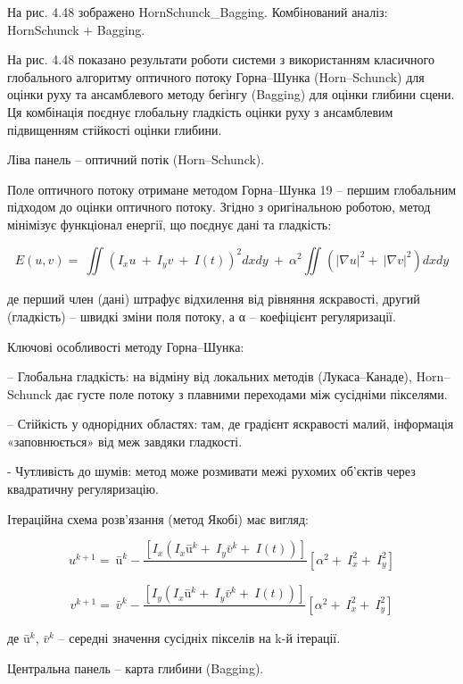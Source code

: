 \documentclass[
]{article}
\begin{document}
На рис. 4.48 зображено HornSchunck\_Bagging. Комбінований аналіз: HornSchunck + Bagging.

На рис. 4.48 показано результати роботи системи з використанням класичного глобального алгоритму оптичного потоку Горна--Шунка (Horn--Schunck) для оцінки руху та ансамблевого методу бегінгу (Bagging) для оцінки глибини сцени. Ця комбінація поєднує глобальну гладкість оцінки руху з ансамблевим підвищенням стійкості оцінки глибини.

Ліва панель -- оптичний потік (Horn--Schunck).

Поле оптичного потоку отримане методом Горна--Шунка 19 -- першим глобальним підходом до оцінки оптичного потоку. Згідно з оригінальною роботою, метод мінімізує функціонал енергії, що поєднує дані та гладкість:

\[E(u,v) = \ \iint_{}^{}{\left( I_{x}u\  + \ I_{y}v\  + \ I(t) \right)^{2}dx}dy\  + \ \alpha^{2}\iint_{}^{}{\left( |\nabla u|^{2} + \ |\nabla v|^{2} \right)dx}dy\]

де перший член (дані) штрафує відхилення від рівняння яскравості, другий (гладкість) -- швидкі зміни поля потоку, а α -- коефіцієнт регуляризації.

Ключові особливості методу Горна--Шунка:

-- Глобальна гладкість: на відміну від локальних методів (Лукаса--Канаде), Horn--Schunck дає густе поле потоку з плавними переходами між сусідніми пікселями.

-- Стійкість у однорідних областях: там, де градієнт яскравості малий, інформація «заповнюється» від меж завдяки гладкості.

- Чутливість до шумів: метод може розмивати межі рухомих об'єктів через квадратичну регуляризацію.

Ітераційна схема розв'язання (метод Якобі) має вигляд:

\[u^{k + 1} = \ ū^{k} - \frac{\left\lbrack I_{x}\left( I_{x}ū^{k} + \ I_{y}{\bar{v}}^{k} + \ I(t) \right) \right\rbrack}{}\left\lbrack \alpha^{2} + \ I_{x}^{2} + \ I_{y}^{2} \right\rbrack\]

\[v^{k + 1} = \ {\bar{v}}^{k} - \frac{\left\lbrack I_{y}\left( I_{x}ū^{k} + \ I_{y}{\bar{v}}^{k} + \ I(t) \right) \right\rbrack}{}\left\lbrack \alpha^{2} + \ I_{x}^{2} + \ I_{y}^{2} \right\rbrack\]

де \(ū^{k}\), \({\bar{v}}^{k}\) -- середні значення сусідніх пікселів на k-й ітерації.

Центральна панель -- карта глибини (Bagging).
\end{document}
